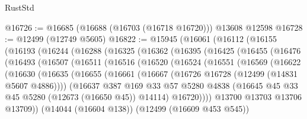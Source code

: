\begin{lexlean}{RustStd}
\begin{coremodule}
{\begin{coremodule}
{{{{{{{{{{{{{{{{{{{{{{{{{{{{{{{{{{{{{{{{{{{{{{{{{{{{{{{{{{{{{{{{{{{{{{{{{{{{{{{{@16726 := @16685 (@16688 (@16703 (@16718 @16720))) @13608 @12598
@16728 := @12499 (@12749 @5605)
@16822 := @15945
    (@16061
      (@16112
        (@16155
          (@16193
            (@16244
              (@16288
                (@16325
                  (@16362
                    (@16395
                      (@16425
                        (@16455
                          (@16476
                            (@16493
                              (@16507
                                (@16511
                                  (@16516
                                    (@16520
                                      (@16524
                                        (@16551
                                          (@16569
                                            (@16622
                                              (@16630
                                                (@16635
                                                  (@16655
                                                    (@16661
                                                      (@16667
                                                        (@16726
                                                          @16728
                                                          (@12499 (@14831 @5607 @4886))))
                                                      (@16637
                                                        @387
                                                        @169
                                                        @33
                                                        @57
                                                        @5280
                                                        @4838
                                                        (@16645
                                                          @45
                                                          @33
                                                          @45
                                                          @5280
                                                          (@12673 (@16650 @45))
                                                          @14114)
                                                        @16720))))
                                                @13700
                                                @13703
                                                @13706
                                                @13709))
                                            (@14044 (@16604 @138))
                                            (@12499 (@16609 @453 @545))
}}}}}}}}}}}}}}}}}}}}}}}}}}}}}}}}}}}}}}}}}}}}}}}}}}}}}}}}}}}}}}}}}}}}}}}}}}}}}}}}
\end{coremodule}}
\end{coremodule}
\end{lexlean}

